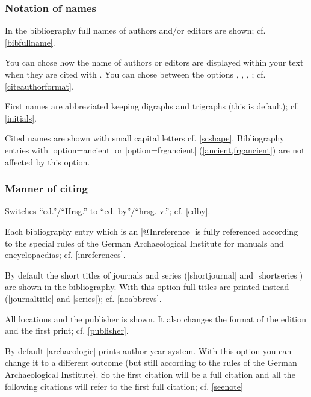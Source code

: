 \documentclass[a4paper,
10pt,
greek,
french,
spanish,
italian,
ngerman,
english
]{ltxdoc}
\begin{document}
\subsubsection{Notation of names}
In the bibliography full names of authors and/or editors are shown; cf. \cref{bibfullname}.

You can chose how the name of authors or editors are displayed within your text when they are cited with .
You can chose between the options , , , ; 
cf. \cref{citeauthorformat}.



First names are abbreviated keeping digraphs and trigraphs (this is default); cf. \cref{initials}.

Cited names are shown with small capital letters cf. \cref{scshape}.
Bibliography entries with |option={ancient}| or |option={frgancient}| (\cref{ancient,frgancient}) are not affected by this option.

\subsubsection{Manner of citing}

Switches \enquote{ed.}/\enquote{Hrsg.} to \enquote{ed. by}/\enquote{hrsg. v.}; cf. \cref{edby}.

Each bibliography entry which is an |@Inreference| is fully referenced according to the special rules of the 
German Archaeological Institute for manuals and encyclopaedias; cf. \cref{inreferences}.

By default the short titles of journals and series (|shortjournal| and |shortseries|) are shown in the bibliography.
With this option full titles are printed instead (|journaltitle| and |series|); cf. \cref{noabbrevs}.

All locations and the publisher is shown. 
It also changes the format of the edition and the first print; cf. \cref{publisher}.

By default |archaeologie| prints author-year-system. 
With this option you can change it to a different outcome (but still according to the rules of the German Archaeological Institute). 
So the first citation will be a full citation and all the following citations will refer to the first full citation; cf. \cref{seenote}
\end{document}
